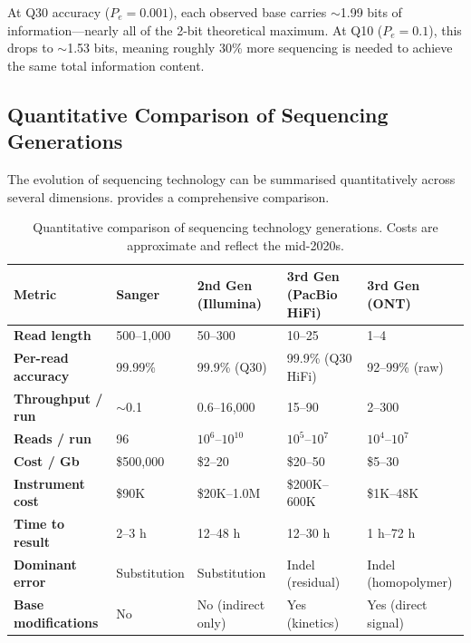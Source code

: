 At Q30 accuracy ($P_e = 0.001$), each observed base carries $\sim$1.99 bits of information---nearly all of the 2-bit theoretical maximum. At Q10 ($P_e = 0.1$), this drops to $\sim$1.53 bits, meaning roughly 30\% more sequencing is needed to achieve the same total information content.


\subsection{Quantitative Comparison of Sequencing Generations}
\label{subsec:intro:generation-comparison}

The evolution of sequencing technology can be summarised quantitatively across several dimensions.  provides a comprehensive comparison.

\begin{table}[htbp]
\centering
\caption[Quantitative comparison of sequencing generations.]{Quantitative comparison of sequencing technology generations. Costs are approximate and reflect the mid-2020s.}
\label{tab:intro:generation-comparison}
\small
\begin{tabularx}{\textwidth}{>{\bfseries}l X X X X}
\toprule
\textbf{Metric} & \textbf{Sanger} & \textbf{2nd Gen (Illumina)} & \textbf{3rd Gen (PacBio HiFi)} & \textbf{3rd Gen (ONT)} \\
\midrule
Read length & 500--1,000\basepair{} & 50--300\basepair{} & 10--25\kilobase{} & 1\kilobase{}--4\megabase{} \\
\addlinespace
Per-read accuracy & 99.99\% & 99.9\% (Q30) & 99.9\% (Q30 HiFi) & 92--99\% (raw) \\
\addlinespace
Throughput / run & $\sim$0.1\megabase{} & 0.6--16,000\gigabase{} & 15--90\gigabase{} & 2--300\gigabase{} \\
\addlinespace
Reads / run & 96 & $10^6$--$10^{10}$ & $10^5$--$10^7$ & $10^4$--$10^7$ \\
\addlinespace
Cost / Gb & \$500,000 & \$2--20 & \$20--50 & \$5--30 \\
\addlinespace
Instrument cost & \$90K & \$20K--1.0M & \$200K--600K & \$1K--48K \\
\addlinespace
Time to result & 2--3 h & 12--48 h & 12--30 h & 1 h--72 h \\
\addlinespace
Dominant error & Substitution & Substitution & Indel (residual) & Indel (homopolymer) \\
\addlinespace
Base modifications & No & No (indirect only) & Yes (kinetics) & Yes (direct signal) \\
\bottomrule
\end{tabularx}
\end{table}

